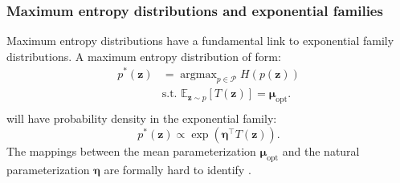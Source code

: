 \documentclass[11pt]{article}
\DeclareMathOperator*{\argmax}{argmax}
\begin{document}
\subsubsection{Maximum entropy distributions and exponential families}\label{methods_ME_EF}
Maximum entropy distributions have a fundamental link to exponential family distributions. 
A maximum entropy distribution of form:
\begin{equation} \label{eq:max_ent}
\begin{split}
p^*(\mathbf{z}) &= \argmax_{p \in \mathcal{P}} H(p(\mathbf{z})) \\
 &  \text{s.t.  } \mathbb{E}_{\mathbf{z} \sim p}\left[T(\mathbf{z})\right] = \bm{\mu}_{\text{opt}}. \\
 \end{split}
\end{equation} 
will have probability density in the exponential family:
\begin{equation}
p^*(\mathbf{z}) \propto \exp(\bm{\eta}^\top T(\textbf{z})).
\end{equation}
The mappings between the mean parameterization $\bm{\mu}_{\text{opt}}$ and the natural parameterization $\bm{\eta}$ are formally hard to identify \cite{wainwright2008graphical}.
\end{document}
